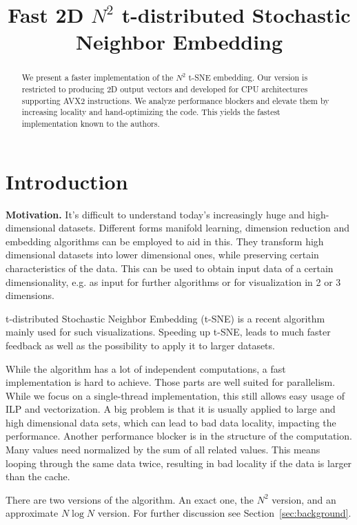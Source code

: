 \documentclass[letterpaper]{article}
\title{Fast 2D $N^2$ t-distributed Stochastic Neighbor Embedding}
\newcommand{\mypar}[1]{{\bf #1.}}
\begin{document}
%
\maketitle
%

\begin{abstract}
We present a faster implementation of the $N^2$ t-SNE embedding. Our version is restricted to producing 2D output vectors and developed for CPU architectures supporting AVX2 instructions. We analyze performance blockers and elevate them by increasing locality and hand-optimizing the code. This yields the fastest implementation known to the authors.
\end{abstract}

\section{Introduction}\label{sec:intro}

\mypar{Motivation} It's difficult to understand today's increasingly huge and high-dimensional datasets. Different forms manifold learning, dimension reduction and embedding algorithms can be employed to aid in this. They transform high dimensional datasets into lower dimensional ones, while preserving certain characteristics of the data. This can be used to obtain input data of a certain dimensionality, e.g. as input for further algorithms or for visualization in 2 or 3 dimensions.

t-distributed Stochastic Neighbor Embedding (t-SNE) is a recent \cite{maaten_visualizing_2008, van_der_maaten_accelerating_2014} algorithm mainly used for such visualizations. Speeding up t-SNE, leads to much faster feedback as well as the possibility to apply it to larger datasets.

While the algorithm has a lot of independent computations, a fast implementation is hard to achieve. Those parts are well suited for parallelism. While we focus on a single-thread implementation, this still allows easy usage of ILP and vectorization. A big problem is that it is usually applied to large and high dimensional data sets, which can lead to bad data locality, impacting the performance.
Another performance blocker is in the structure of the computation. Many values need normalized by the sum of all related values. This means looping through the same data twice, resulting in bad locality if the data is larger than the cache.

There are two versions of the algorithm. An exact one, the $N^2$ version, and an approximate $N \log N$ version. For further discussion see Section~\ref{sec:background}.
\end{document}
